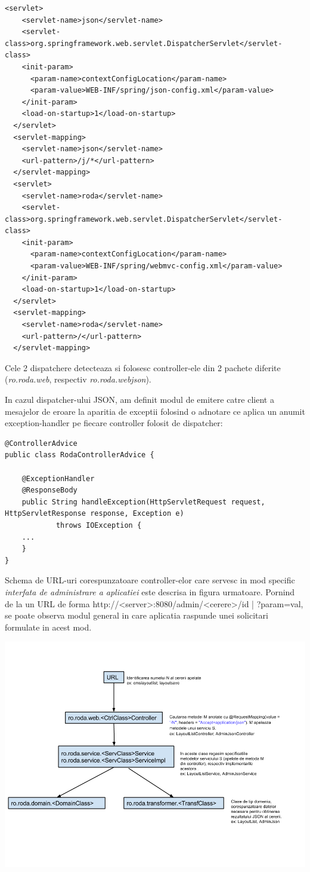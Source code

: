 \begin{lstlisting}[breaklines=true]
  <servlet>
    <servlet-name>json</servlet-name>
    <servlet-class>org.springframework.web.servlet.DispatcherServlet</servlet-class>
    <init-param>
      <param-name>contextConfigLocation</param-name>
      <param-value>WEB-INF/spring/json-config.xml</param-value>
    </init-param>
    <load-on-startup>1</load-on-startup>
  </servlet>
  <servlet-mapping>
    <servlet-name>json</servlet-name>
    <url-pattern>/j/*</url-pattern>
  </servlet-mapping>
  <servlet>
    <servlet-name>roda</servlet-name>
    <servlet-class>org.springframework.web.servlet.DispatcherServlet</servlet-class>
    <init-param>
      <param-name>contextConfigLocation</param-name>
      <param-value>WEB-INF/spring/webmvc-config.xml</param-value>
    </init-param>
    <load-on-startup>1</load-on-startup>
  </servlet>
  <servlet-mapping>
    <servlet-name>roda</servlet-name>
    <url-pattern>/</url-pattern>
  </servlet-mapping>
\end{lstlisting}

Cele 2 dispatchere detecteaza si folosesc controller-ele din 2 pachete diferite (\emph{ro.roda.web}, respectiv \emph{ro.roda.webjson}).

In cazul dispatcher-ului JSON, am definit modul de emitere catre client a mesajelor de eroare la aparitia de exceptii 
folosind o adnotare ce aplica un anumit exception-handler pe fiecare controller folosit de dispatcher:

\begin{lstlisting}[breaklines=true]
@ControllerAdvice
public class RodaControllerAdvice {

	@ExceptionHandler
	@ResponseBody
	public String handleException(HttpServletRequest request, HttpServletResponse response, Exception e)
			throws IOException {
	...	
	}
}
\end{lstlisting}

\bigskip

Schema de URL-uri corespunzatoare controller-elor care servesc in mod specific \emph{interfata de administrare a aplicatiei} este descrisa in figura urmatoare. 
Pornind de la un URL de forma http://<server>:8080/admin/<cerere>/{{id} | ?param=val}, se poate observa modul general in care aplicatia raspunde unei solicitari formulate in acest mod.

\bigskip

\begin{center}
\includegraphics[width=\textwidth]{roda_URL.png}
\end{center}

\bigskip